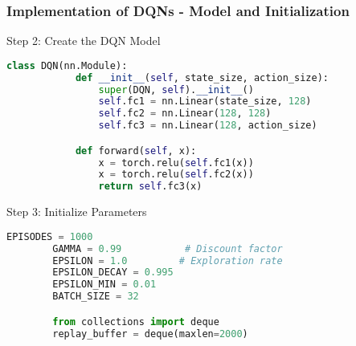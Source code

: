 \documentclass[aspectratio=169]{beamer}
\begin{document}
\begin{frame}[fragile]
    \frametitle{Implementation of DQNs - Model and Initialization}
    \begin{block}{Step 2: Create the DQN Model}
        \begin{lstlisting}[language=python]
        class DQN(nn.Module):
            def __init__(self, state_size, action_size):
                super(DQN, self).__init__()
                self.fc1 = nn.Linear(state_size, 128)
                self.fc2 = nn.Linear(128, 128)
                self.fc3 = nn.Linear(128, action_size)

            def forward(self, x):
                x = torch.relu(self.fc1(x))
                x = torch.relu(self.fc2(x))
                return self.fc3(x)
        \end{lstlisting}
    \end{block}
    
    \begin{block}{Step 3: Initialize Parameters}
        \begin{lstlisting}[language=python]
        EPISODES = 1000
        GAMMA = 0.99           # Discount factor
        EPSILON = 1.0         # Exploration rate
        EPSILON_DECAY = 0.995
        EPSILON_MIN = 0.01
        BATCH_SIZE = 32

        from collections import deque
        replay_buffer = deque(maxlen=2000)
        \end{lstlisting}
    \end{block}
\end{frame}
\end{document}
